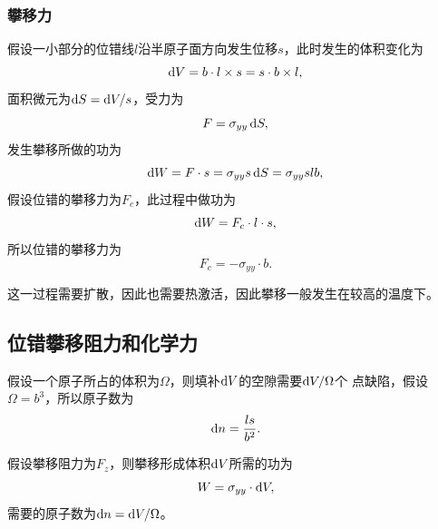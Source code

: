                 \subsubsection{攀移力}
                    假设一小部分的位错线$l$沿半原子面方向发生位移$s$，此时发生的体积变化为
                    \begin{equation}
                        \mathop{}\!\mathrm{d} V=b\cdot l\times s=s\cdot b\times l,
                    \end{equation}
                    面积微元为$\mathop{}\!\mathrm{d} S=\mathop{}\!\mathrm{d} V/s$，受力为
                    \begin{equation}
                        F=\sigma_{yy}\mathop{}\!\mathrm{d} S,
                    \end{equation}
                    发生攀移所做的功为
                    \begin{equation}
                        \mathop{}\!\mathrm{d} W=F\cdot s=\sigma_{yy} s\mathop{}\!\mathrm{d} S=\sigma_{yy}slb,
                    \end{equation}
                    假设位错的攀移力为$F_c$，此过程中做功为
                    \begin{equation}
                        \mathop{}\!\mathrm{d} W=F_c\cdot l\cdot s,
                    \end{equation}
                    所以位错的攀移力为
                    \begin{equation}
                        F_c=-\sigma_{yy}\cdot b.
                    \end{equation}
                    
                    这一过程需要扩散，因此也需要热激活，因此攀移一般发生在较高的温度下。
                \subsection{位错攀移阻力和化学力}
                    假设一个原子所占的体积为$\Omega$，则填补$\mathop{}\!\mathrm{d} V$的空隙需要$\mathop{}\!\mathrm{d} V/\Omega$个
                    点缺陷，假设$\Omega=b^3$，所以原子数为
                    \begin{equation}
                        \mathop{}\!\mathrm{d} n=\frac{ls}{b^2}.
                    \end{equation}

                    假设攀移阻力为$F_z$，则攀移形成体积$\mathop{}\!\mathrm{d} V$所需的功为
                    \begin{equation}
                        W=\sigma_{yy}\cdot\mathop{}\!\mathrm{d} V,
                    \end{equation}
                    需要的原子数为$\mathop{}\!\mathrm{d} n=\mathop{}\!\mathrm{d} V/\Omega$。


